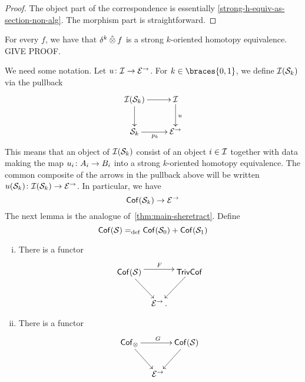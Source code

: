 \documentclass[reqno,10pt,a4paper,oneside,draft]{amsart}
\begin{document}
{{\begin{proof} The object part of the correspondence is essentially \cref{strong-h-equiv-as-section-non-alg}. The morphism part is
straightforward. 
\end{proof}

\begin{remark} \label{thm:kcylf-is-she-alg}
For every $f$, we have that $\kcyl \hatotimes f$ is a strong $k$-oriented homotopy equivalence. GIVE PROOF.
\end{remark} 


We need some notation. Let $u \co \cal{I} \to \cal{E}^\to$. For $k \in \braces{0,1}$, we define $\cal{I}(\cal{S}_k)$ via the pullback
\begin{equation}
\label{rel-strong-h-equiv-def}
\begin{gathered}
\xymatrix{
 \cal{I}(\cal{S}_k) \ar[r] \ar[d] & \cal{I} \ar[d]^u \\
\cal{S}_k \ar[r]_{p_k} & \cal{E}^\to
}
\end{gathered}
\end{equation}
This means that an object of $\cal{I}(\cal{S}_k)$ consist of an object $i \in \cal{I}$ together with data making the map $u_i \co
A_i \to B_i$ into a 
strong $k$-oriented homotopy equivalence. The common composite of the arrows in the pullback above will be written
 $u(\cal{S}_k) \co \cal{I}(\cal{S}_k) \to \cal{E}^\to$. In particular, we have
\[
\Cof ( \cal{S}_k ) \to \cal{E}^\to
\]
The next lemma is the analogue of~\cref{thm:main-sheretract}. Define
\[
\Cof(\cal{S}) \defeq  \Cof(\cal{S}_0) + \Cof(\cal{S}_1)
\]


\begin{proposition} \label{thm:strong-hequiv} \hfill 
\begin{enumerate}[(i)]
\item   \label{thm:onedir} There is a functor
\[
\xymatrix@!C@C-2.5em{
\Cof(\cal{S})
  \ar[dr]
  \ar@<4pt>[rr]^F
&&
  \TrivCof
  \ar[dl]
\\&
  \catE^\to \, .
}
\]
\item  \label{thm:twodir} There is a functor
\[
\xymatrix@!C@C-2.5em{
    \Cof_\otimes
  \ar[dr]
  \ar[rr]^G
&&
\Cof(\cal{S})
  \ar[dl]
\\&
  \catE^\to
}
\]
\end{enumerate}
\end{proposition}

}}
\end{document}
